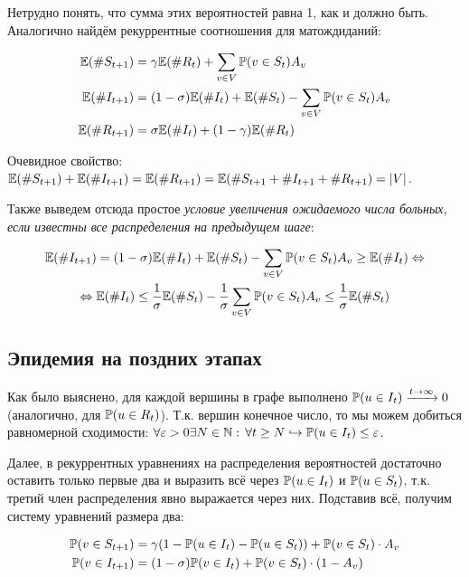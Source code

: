 	Нетрудно понять, что сумма этих вероятностей равна 1, как и должно быть. Аналогично найдём рекуррентные соотношения для матождиданий:
	
	\begin{align*}
		\mathbb{E}(\#S_{t+1}) &= \gamma \mathbb{E}(\#R_{t}) + \sum\limits_{v \in V} \mathbb{P}(v \in S_t) A_v \\
		\mathbb{E}(\#I_{t+1}) &= (1 - \sigma) \mathbb{E}(\#I_{t}) + \mathbb{E}(\#S_{t}) - \sum\limits_{v \in V} \mathbb{P}(v \in S_t) A_v \\
		\mathbb{E}(\#R_{t+1}) &=  \sigma \mathbb{E}(\# I_t) + (1 - \gamma) \mathbb{E}(\#R_{t})
	\end{align*}

	Очевидное свойство: $\mathbb{E}(\#S_{t+1}) + \mathbb{E}(\#I_{t+1}) = \mathbb{E}(\#R_{t+1}) = \mathbb{E}(\#S_{t+1} + \#I_{t+1} + \#R_{t+1}) = |V|$.
	
	Также выведем отсюда простое \textit{условие увеличения ожидаемого числа больных, если известны все распределения на предыдущем шаге}:
	
	\begin{multline*}
		\mathbb{E}(\#I_{t+1}) = (1 - \sigma) \mathbb{E}(\#I_{t}) + \mathbb{E}(\#S_{t}) - \sum\limits_{v \in V} \mathbb{P}(v \in S_t) A_v \ge \mathbb{E}(\#I_{t}) \Leftrightarrow \\
		\Leftrightarrow \mathbb{E}(\#I_{t}) \le \frac{1}{\sigma} \mathbb{E}(\#S_{t}) - \frac{1}{\sigma} \sum\limits_{v \in V} \mathbb{P}(v \in S_t) A_v \le \frac{1}{\sigma} \mathbb{E}(\#S_{t})
	\end{multline*}

	\subsection*{Эпидемия на поздних этапах}
	
	Как было выяснено, для каждой вершины в графе выполнено $\mathbb{P}(u \in I_t) \xrightarrow{t \to \infty} 0$ (аналогично, для $\mathbb{P}(u \in R_t)$). Т.к. вершин конечное число, то мы можем добиться равномерной сходимости: $\forall \varepsilon > 0 \exists N \in \mathbb{N}: \, \forall t \ge N \hookrightarrow \mathbb{P}(u \in I_t) \le \varepsilon$.
	
	Далее, в рекуррентных уравнениях на распределения вероятностей достаточно оставить только первые два и выразить всё через $\mathbb{P}(u \in I_t)$ и $\mathbb{P}(u \in S_t)$, т.к. третий член распределения явно выражается через них. Подставив всё, получим систему уравнений размера два:
	
	\begin{align*}
		\mathbb{P}(v \in S_{t+1}) &= \gamma (1 - \mathbb{P}(u \in I_t) - \mathbb{P}(u \in S_t)) + \mathbb{P}(v \in S_t) \cdot A_v \\
		\mathbb{P}(v \in I_{t+1}) &= (1 - \sigma) \mathbb{P}(v \in I_t) + \mathbb{P}(v \in S_t) \cdot (1 - A_v) \\
	\end{align*}

